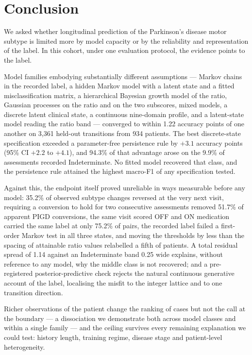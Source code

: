 \documentclass[11pt]{article}
\begin{document}
\section{Conclusion}

We asked whether longitudinal prediction of the Parkinson's disease motor subtype
is limited more by model capacity or by the reliability and representation of the
label. In this cohort, under one evaluation protocol, the evidence points to the
label.

Model families embodying substantially different assumptions --- Markov chains in
the recorded label, a hidden Markov model with a latent state and a fitted
misclassification matrix, a hierarchical Bayesian growth model of the ratio,
Gaussian processes on the ratio and on the two subscores, mixed models, a discrete
latent clinical state, a continuous nine-domain profile, and a latent-state model
reading the ratio band --- converged to within 1.22 accuracy points of one another
on 3,361 held-out transitions from 934 patients. The best discrete-state
specification exceeded a parameter-free persistence rule by $+3.1$ accuracy points
(95\% CI $+2.2$ to $+4.1$), and 94.3\% of that advantage arose on the 9.9\% of
assessments recorded Indeterminate. No fitted model recovered that class, and the
persistence rule attained the highest macro-F1 of any specification tested.

Against this, the endpoint itself proved unreliable in ways measurable before any
model: 35.2\% of observed subtype changes reversed at the very next visit,
requiring a conversion to hold for two consecutive assessments removed 51.7\% of
apparent PIGD conversions, the same visit scored OFF and ON medication carried the
same label at only 75.2\% of pairs, the recorded label failed a first-order Markov
test in all three states, and moving the thresholds by less than the spacing of
attainable ratio values relabelled a fifth of patients. A total residual spread of
1.14 against an Indeterminate band 0.25 wide explains, without reference to any
model, why the middle class is not recovered; and a pre-registered
posterior-predictive check rejects the natural continuous generative account of
the label, localising the misfit to the integer lattice and to one transition
direction.

Richer observations of the patient change the ranking of cases but not the call at
the boundary --- a dissociation we demonstrate both across model classes and
within a single family --- and the ceiling survives every remaining explanation we
could test: history length, training regime, disease stage and patient-level
heterogeneity.
\end{document}

